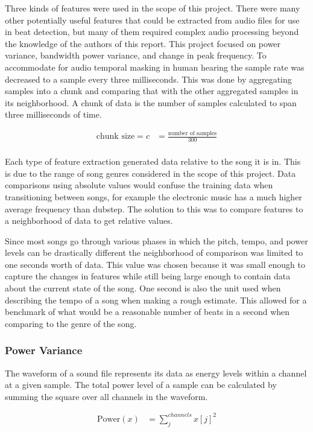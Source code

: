 Three kinds of features were used in the scope of this project. There were many other potentially useful features that could be extracted from audio files for use in beat detection, but many of them required complex audio processing beyond the knowledge of the authors of this report. This project focused on power variance, bandwidth power variance, and change in peak frequency. To accommodate for audio temporal masking in human hearing the sample rate was decreased to a sample every three milliseconds. This was done by aggregating samples into a chunk and comparing that with the other aggregated samples in its neighborhood. A chunk of data is the number of samples calculated to span three milliseconds of time.

\begin{align*}
	\text{chunk size} = c &= \frac{\text{number of samples}}{300}\\
\end{align*}

Each type of feature extraction generated data relative to the song it is in. This is due to the range of song genres considered in the scope of this project. Data comparisons using absolute values would confuse the training data when transitioning between songs, for example the electronic music has a much higher average frequency than dubstep. The solution to this was to compare features to a neighborhood of data to get relative values.

Since most songs go through various phases in which the pitch, tempo, and power levels can be drastically different the neighborhood of comparison was limited to one seconds worth of data. This value was chosen because it was small enough to capture the changes in features while still being large enough to contain data about the current state of the song. One second is also the unit used when describing the tempo of a song when making a rough estimate. This allowed for a benchmark of what would be a reasonable number of beats in a second when comparing to the genre of the song.

\subsubsection{Power Variance}
The waveform of a sound file represents its data as energy levels within a channel at a given sample. The total power level of a sample can be calculated by summing the square over all channels in the waveform.

\begin{align*}
 	\text{Power}(x) &= \sum_j^{channels} x[j]^2
 \end{align*}

